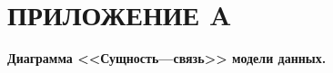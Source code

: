 \section*{ПРИЛОЖЕНИЕ A}

\centering 
\textbf{Диаграмма <<Сущность---связь>> модели данных.}



\pagebreak